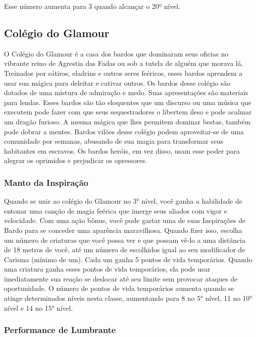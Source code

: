 \documentclass{RPG_Adventure}[2021/10/20]
\begin{document}
Esse número aumenta para 3 quando alcançar o 20º nível.

\subsection*{Colégio do Glamour}%
\label{sub:colegio_do_glamour}

O Colégio do Glamour é a casa dos bardos que dominaram seus oficias no vibrante
reino de Agrestia das Fadas ou sob a tutela de alguém que morava lá.  Treinados
por sátiros, eladrins e outros seres feéricos, esses bardos aprendem a usar sua
mágica para deleitar e cativar outros.
Os bardos desse colégio são dotados de uma mistura de admiração e medo. Suas
apresentações são materiais para lendas. Esses bardos são tão eloquentes que um
discurso ou uma música que executem pode fazer com que seus sequestradores o
libertem ileso e pode acalmar um dragão furioso. A mesma mágica que lhes
permitem dominar bestas, também pode dobrar a mentes. Bardos vilões desse
colégio podem aproveitar-se de uma comunidade por semanas, abusando de sua
magia para transformar seus habitantes em escravos. Os bardos heróis, em vez
disso, usam esse poder para alegrar os oprimidos e prejudicar os opressores.

\subsubsection{Manto da Inspiração}%

Quando se unir ao colégio do Glamour no 3° nível, você ganha a habilidade de
entonar uma canção de magia feérica que imerge seus aliados com vigor e
velocidade.
Com uma ação bônus, você pode gastar uma de suas Inspirações de Bardo para se
conceder uma aparência maravilhosa. Quando fizer isso, escolha um número de
criaturas que você possa ver e que possam vê-lo a uma distãncia de 18 metros de
você, até um número de escolhidos igual ao seu modificador de Carisma (mínimo de
um). Cada um ganha 5 pontos de vida temporários. Quando uma criatura ganha
esses pontos de vida temporários, ela pode usar imediatamente sua reação se
deslocar até seu limite sem provocar ataques de oportunidade.
O número de pontos de vida temporários aumenta quando se atinge determinados
níveis nesta classe, aumentando para 8 no 5° nível, 11 no 10° nível e 14 no 15°
nível.

\subsubsection{Performance de Lumbrante}%
\end{document}
